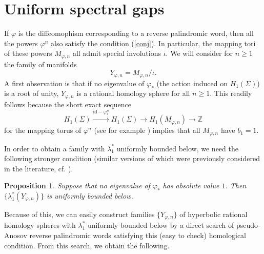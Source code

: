 \documentclass[11pt]{amsart}
\newtheorem{prop}{Proposition}[section]
\theoremstyle{definition}
\theoremstyle{remark}
\begin{document}
\section{Uniform spectral gaps}
If $\varphi$ is the diffeomophism corresponding to a reverse palindromic word, then all the powers $\varphi^n$ also satisfy the condition (\ref{conj}). In particular, the mapping tori of these powers $M_{\varphi,n}$ all admit special involutions $\iota$. We will consider for $n\geq1$ the family of manifolds
\begin{equation*}
Y_{\varphi,n}=M_{\varphi,n}/\iota.
\end{equation*}
A first observation is that if no eigenvalue of $\varphi_*$ (the action induced on $H_1(\Sigma)$) is a root of unity, $Y_{\varphi,n}$ is a rational homology sphere for all $n\geq1$. This readily follows because the short exact sequence
\begin{equation*}
H_1(\Sigma)\stackrel{\mathrm{id}-\varphi^n_*}{\longrightarrow}H_1(\Sigma)\rightarrow H_1(M_{\varphi,n})\rightarrow \mathbb{Z}
\end{equation*}
for the mapping torus of $\varphi^n$ (see for example \cite{Hat}) implies that all $M_{\varphi,n}$ have $b_1=1$.
\\
\par
In order to obtain a family with $\lambda_1^*$ uniformly bounded below, we need the following stronger condition (similar versions of which were previously considered in the literature, cf. \cite{Lot}).
\begin{prop}\label{gap}
Suppose that no eigenvalue of $\varphi_*$ has absolute value $1$. Then $\{\lambda_1^*(Y_{\varphi,n})\}$ is uniformly bounded below.
\end{prop}

Because of this, we can easily construct families $\{Y_{\varphi,n}\}$ of hyperbolic rational homology spheres with $\lambda_1^*$ uniformly bounded below by a direct search of pseudo-Anosov reverse palindromic words satisfying this (easy to check) homological condition. From this search, we obtain the following.
\end{document}
